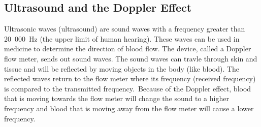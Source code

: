\subsection{Ultrasound and the Doppler Effect}
Ultrasonic waves (ultrasound) are sound waves with a frequency greater than 20~000~Hz (the upper limit of human hearing). These waves can be used in medicine to determine the direction of blood flow. The device, called a Doppler flow meter, sends out sound waves. The sound waves can travle through skin and tissue and will be reflected by moving objects in the body (like blood). The reflected waves return to the flow meter where its frequency (received frequency) is compared to the transmitted frequency.\
Because of the Doppler effect, blood that is moving towards the flow meter will change the sound to a higher frequency and blood that is moving away from the flow meter will cause a lower frequency.

